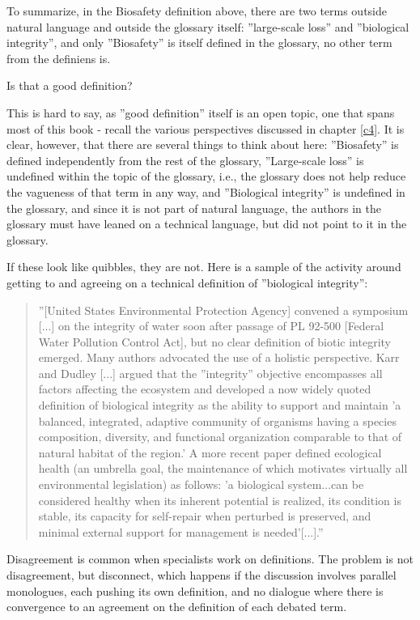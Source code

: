 To summarize, in the Biosafety definition above, there are two terms outside natural language and outside the glossary itself: ''large-scale loss'' and ''biological integrity'', and only ''Biosafety'' is itself defined in the glossary, no other term from the definiens is.

Is that a good definition?

This is hard to say, as ''good definition'' itself is an open topic, one that spans most of this book - recall the various perspectives discussed in chapter \ref{c4}. It is clear, however, that there are several things to think about here:
''Biosafety'' is defined independently from the rest of the glossary,
''Large-scale loss'' is undefined within the topic of the glossary, i.e., the glossary does not help reduce the vagueness of that term in any way, and
''Biological integrity'' is undefined in the glossary, and since it is not part of natural language, the authors in the glossary must have leaned on a technical language, but did not point to it in the glossary.

If these look like quibbles, they are not. Here is a sample of the activity around getting to and agreeing on a technical definition of ''biological integrity'':

\begin{quote}
''[United States Environmental Protection Agency] convened a symposium [...] on the integrity of water soon after passage of PL 92-500 [Federal Water Pollution Control Act], but no clear definition of biotic integrity emerged. Many authors advocated the use of a holistic perspective. Karr and Dudley [...] argued that the ''integrity'' objective encompasses all factors affecting the ecosystem and developed a now widely quoted definition of biological integrity as the ability to support and maintain 'a balanced, integrated, adaptive community of organisms having a species composition, diversity, and functional organization comparable to that of natural habitat of the region.' A more recent paper defined ecological health (an umbrella goal, the maintenance of which motivates virtually all environmental legislation) as follows: 'a biological system...can be considered healthy when its inherent potential is realized, its condition is stable, its capacity for self-repair when perturbed is preserved, and minimal external support for management is needed'[...].'' \cite{karr1991biological}
\end{quote}

Disagreement is common when specialists work on definitions. The problem is not disagreement, but disconnect, which happens if the discussion involves parallel monologues, each pushing its own definition, and no dialogue where there is convergence to an agreement on the definition of each debated term.

